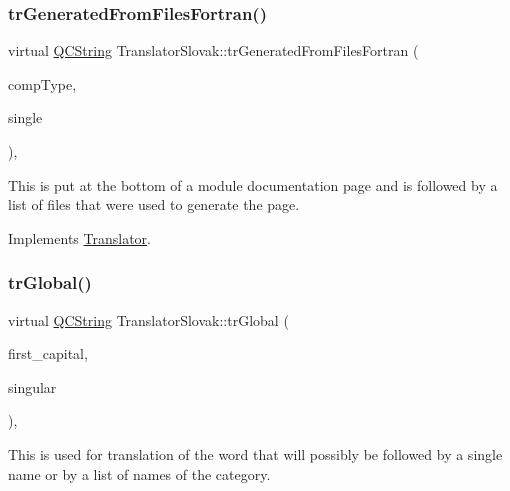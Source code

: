 \mbox{\label{class_translator_slovak_ae37a8b1aed043cb480ca26adabea3f0a}} 
\subsubsection{\texorpdfstring{trGeneratedFromFilesFortran()}{trGeneratedFromFilesFortran()}}
{\footnotesize\ttfamily virtual \mbox{\hyperlink{class_q_c_string}{Q\+C\+String}} Translator\+Slovak\+::tr\+Generated\+From\+Files\+Fortran (\begin{DoxyParamCaption}\item[{\mbox{\hyperlink{class_class_def_ae70cf86d35fe954a94c566fbcfc87939}{Class\+Def\+::\+Compound\+Type}}}]{comp\+Type,  }\item[{bool}]{single }\end{DoxyParamCaption})\hspace{0.3cm}{\ttfamily [inline]}, {\ttfamily [virtual]}}

This is put at the bottom of a module documentation page and is followed by a list of files that were used to generate the page. 

Implements \mbox{\hyperlink{class_translator}{Translator}}.

\mbox{\label{class_translator_slovak_a9a30c678c62285be7d97245762a3e2d1}} 
\subsubsection{\texorpdfstring{trGlobal()}{trGlobal()}}
{\footnotesize\ttfamily virtual \mbox{\hyperlink{class_q_c_string}{Q\+C\+String}} Translator\+Slovak\+::tr\+Global (\begin{DoxyParamCaption}\item[{bool}]{first\+\_\+capital,  }\item[{bool}]{singular }\end{DoxyParamCaption})\hspace{0.3cm}{\ttfamily [inline]}, {\ttfamily [virtual]}}

This is used for translation of the word that will possibly be followed by a single name or by a list of names of the category. 

